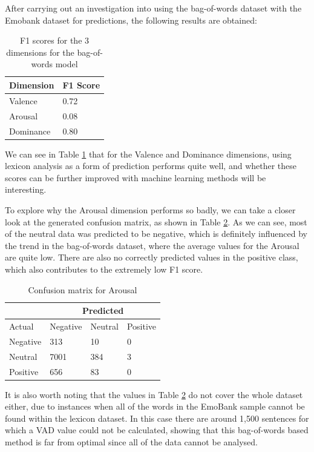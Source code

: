 After carrying out an investigation into using the bag-of-words dataset with the Emobank dataset for predictions, the following results are obtained:

\begin{table}
\centering
\caption{F1 scores for the 3 dimensions for the bag-of-words model}
\begin{tabular}{ |p{3cm}|p{3cm}|}
 \hline
  Dimension & F1 Score \\
 \hline
  Valence & 0.72\\
  Arousal & 0.08 \\
  Dominance & 0.80\\
 \hline
\end{tabular}
\label{lexicon:f1}
\end{table}

We can see in Table \ref{lexicon:f1} that for the Valence and Dominance dimensions, using lexicon analysis as a form of prediction performs quite well, and whether these scores can be further improved with machine learning methods will be interesting.

To explore why the Arousal dimension performs so badly, we can take a closer look at the generated confusion matrix, as shown in Table \ref{lexicon:a:conmat}. As we can see, most of the neutral data was predicted to be negative, which is definitely influenced by the trend in the bag-of-words dataset, where the average values for the Arousal are quite low. There are also no correctly predicted values in the positive class, which also contributes to the extremely low F1 score.

\begin{table}
\centering
\caption{Confusion matrix for Arousal}
\begin{tabular}{ |p{3cm}|p{3cm}|p{3cm}|p{3cm}| }
 \hline
  & \multicolumn{3}{|c|}{Predicted} \\
 \hline
   Actual & Negative & Neutral & Positive \\
    \hline
    Negative &  313   &  10  & 0 \\
    Neutral & 7001 & 384 &  3 \\
    Positive & 656 & 83 &  0 \\
 \hline
\end{tabular}
\label{lexicon:a:conmat}
\end{table}


It is also worth noting that the values in Table \ref{lexicon:a:conmat} do not cover the whole dataset either, due to instances when all of the words in the EmoBank sample cannot be found within the lexicon dataset. In this case there are around 1,500 sentences for which a VAD value could not be calculated, showing that this bag-of-words based method is far from optimal since all of the data cannot be analysed.

